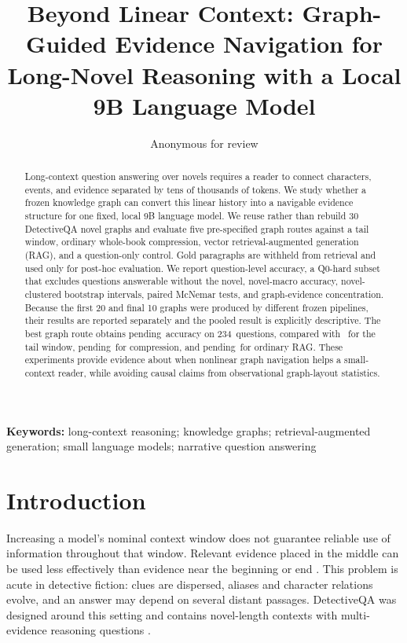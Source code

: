 \documentclass[11pt,a4paper]{article}
\title{Beyond Linear Context: Graph-Guided Evidence Navigation for Long-Novel Reasoning with a Local 9B Language Model}
\author{Anonymous for review}
\date{}
\newcommand{\TotalQuestions}{234}\newcommand{\BestGraphAcc}{pending}
\newcommand{\CompressAcc}{pending}\newcommand{\RAGAcc}{pending}
\begin{document}
\maketitle

\begin{abstract}
Long-context question answering over novels requires a reader to connect characters, events, and evidence separated by tens of thousands of tokens. We study whether a frozen knowledge graph can convert this linear history into a navigable evidence structure for one fixed, local 9B language model. We reuse rather than rebuild 30 DetectiveQA novel graphs and evaluate five pre-specified graph routes against a tail window, ordinary whole-book compression, vector retrieval-augmented generation (RAG), and a question-only control. Gold paragraphs are withheld from retrieval and used only for post-hoc evaluation. We report question-level accuracy, a Q0-hard subset that excludes questions answerable without the novel, novel-macro accuracy, novel-clustered bootstrap intervals, paired McNemar tests, and graph-evidence concentration. Because the first 20 and final 10 graphs were produced by different frozen pipelines, their results are reported separately and the pooled result is explicitly descriptive. The best graph route obtains \BestGraphAcc\ accuracy on \TotalQuestions\ questions, compared with \TailAcc\ for the tail window, \CompressAcc\ for compression, and \RAGAcc\ for ordinary RAG. These experiments provide evidence about when nonlinear graph navigation helps a small-context reader, while avoiding causal claims from observational graph-layout statistics.
\end{abstract}

\noindent\textbf{Keywords:} long-context reasoning; knowledge graphs; retrieval-augmented generation; small language models; narrative question answering

\section{Introduction}
Increasing a model's nominal context window does not guarantee reliable use of information throughout that window. Relevant evidence placed in the middle can be used less effectively than evidence near the beginning or end \citep{liu2024lost,hsieh2024found}. This problem is acute in detective fiction: clues are dispersed, aliases and character relations evolve, and an answer may depend on several distant passages. DetectiveQA was designed around this setting and contains novel-length contexts with multi-evidence reasoning questions \citep{xu2024detectiveqa}.
\end{document}
